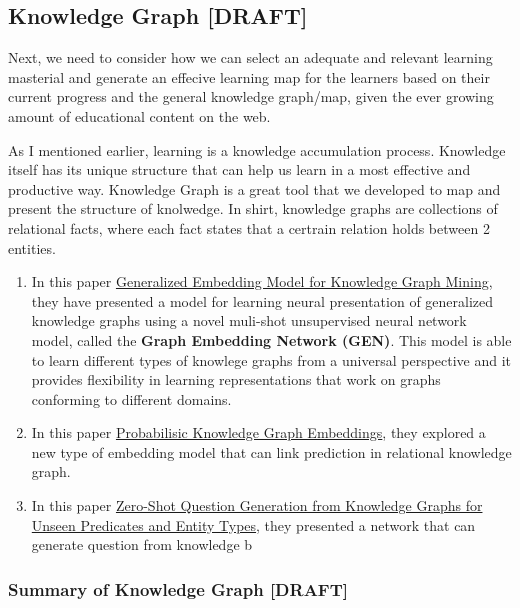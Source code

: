 \documentclass{acm_proc_article-sp}
\begin{document}
\subsection{Knowledge Graph {[}DRAFT{]}}\label{knowledge-graph-draft}

Next, we need to consider how we can select an adequate and relevant
learning masterial and generate an effecive learning map for the
learners based on their current progress and the general knowledge
graph/map, given the ever growing amount of educational content on the
web.

As I mentioned earlier, learning is a knowledge accumulation process.
Knowledge itself has its unique structure that can help us learn in a
most effective and productive way. Knowledge Graph is a great tool that
we developed to map and present the structure of knolwedge. In shirt,
knowledge graphs are collections of relational facts, where each fact
states that a certrain relation holds between 2 entities.

\begin{enumerate}
\def\labelenumi{\arabic{enumi}.}
\item
  In this paper
  \href{http://www.mlgworkshop.org/2018/papers/MLG2018_paper_5.pdf}{Generalized
  Embedding Model for Knowledge Graph Mining}, they have presented a
  model for learning neural presentation of generalized knowledge graphs
  using a novel muli-shot unsupervised neural network model, called the
  \textbf{Graph Embedding Network (GEN)}. This model is able to learn
  different types of knowlege graphs from a universal perspective and it
  provides flexibility in learning representations that work on graphs
  conforming to different domains.
\item
  In this paper
  \href{https://openreview.net/pdf?id=rJ4qXnCqFX}{Probabilisic Knowledge
  Graph Embeddings}, they explored a new type of embedding model that
  can link prediction in relational knowledge graph.
\item
  In this paper \href{http://aclweb.org/anthology/N18-1020}{Zero-Shot
  Question Generation from Knowledge Graphs for Unseen Predicates and
  Entity Types}, they presented a network that can generate question
  from knowledge b
\end{enumerate}

\subsubsection{Summary of Knowledge Graph
{[}DRAFT{]}}\label{summary-of-knowledge-graph-draft}
\end{document}
